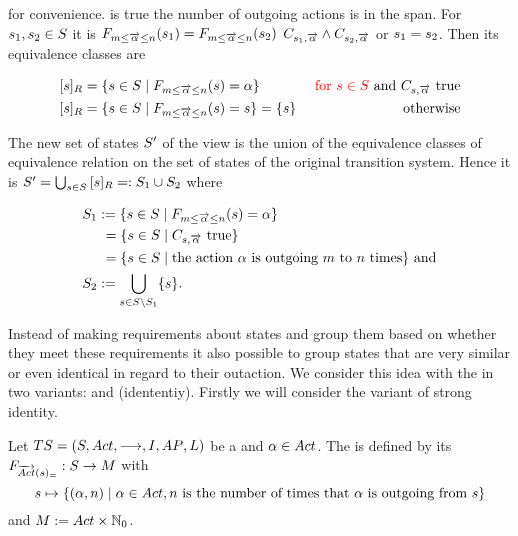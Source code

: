 \documentclass[preview]{standalone}
\begin{document}
for convenience. \formoutact is true  \iffN the number of outgoing actions is in the span. For ${s}_1, {s}_2 \in {S}$ it is ${{{{F}}_{{m}\leq{\overrightarrow{\ensuremath{{\alpha}}}}\leq{n}}}}({s}_1) = {{{{F}}_{{m}\leq{\overrightarrow{\ensuremath{{\alpha}}}}\leq{n}}}}({s}_2)$ \iffN $\formoutact[\state_1] \land \formoutact[\state_2]$ or ${s}_1 = {s}_2$. Then its equivalence classes are

\begin{align*}
	\eqclassv{\state} &= \{\state \in \states \mid \gfctspanoutaction(\state) = \action\} &\redcomment{\text{ for } \state \in \states} \text{ and } \formoutact \text{ true} \\
	\eqclassv{\state} &= \{\state \in \states \mid \gfctspanoutaction(\state) = \state\} = \{\state\} &\text{ otherwise}	
\end{align*}

The new set of states ${S}'$ of the view \viewspanoutaction is the union of the equivalence classes of equivalence relation \eqrelview on the set of states \states of the original transition system. Hence it is ${S}' = \bigcup_{{s} \in {S}} {{[{s}]_{{R}}}} =: {S}_1 \cup {S}_2$ where

\begin{align*}
	\states_1 &:= \{\state \in \states \mid \gfctspanoutaction(\state) = \action\} \\
	&\hspace{1.15mm}= \{\state \in \states  \mid \formoutact \text{ true}\} \\
	&\hspace{1.15mm}= \{\state \in \states \mid \text{the action } \action \text{ is outgoing } \numoutactb \text{ to } \numoutact \text{ times}\} \text{ and} \\
	\states_2 &:= \remstates.
\end{align*}


Instead of making requirements about states and group them based on whether they meet these requirements it also possible to group states that are very similar or even identical in regard to their outaction. We consider this idea with the \emph{\outactident \viewNC} in two variants: \outactidentstrong and \outactidentweak (idententiy). Firstly we will consider the variant of strong identity.

\begin{definition}
	Let ${TS} = {({S}, {Act}, {\longrightarrow}, {I}, {AP}, {L})}$ be a \chosengraphtypeN and ${\alpha} \in {Act}$. The \viewN \viewstrongoutactident is defined by its \grpfctN ${{{{F}}_{{\overrightarrow{{Act}}}({s})_=}}} : {S} \to {\ensuremath{{M}}}$ with
	\[
	\state \mapsto	
	\{(\action, \numoutact) \mid \action \in \actions, \numoutact \text{ is the number of times that \action is outgoing from } \state\}
	\]
	and ${{M}} := {Act} \times {\mathbb{N}}_0$.
\end{definition}
\end{document}
